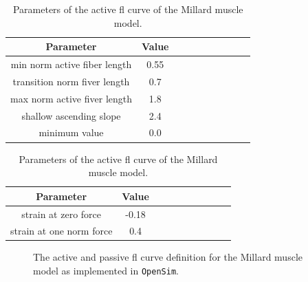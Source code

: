 \documentclass[11pt,a4paper,draft=false]{report}
\begin{document}
\begin{table}
  \centering
  \parbox{.45\linewidth}{
    \centering
    \caption{Parameters of the active \gls{fl} curve of the Millard muscle
      model.}\label{tab:active-fl-curve}
    \begin{tabular}{@{}cccccccccc@{}}
      \toprule
      \textbf{Parameter} & \textbf{Value} \\
      \midrule
      min norm active fiber length & 0.55 \\
      transition norm fiver length & 0.7 \\
      max norm active fiver length & 1.8 \\
      shallow ascending slope &  2.4 \\
      minimum value & 0.0 \\
      \bottomrule
    \end{tabular}
  }
  \quad
  \parbox{.45\linewidth}{
    \vspace{-1.5cm}
    \centering
    \caption{Parameters of the active \gls{fl} curve of the Millard muscle
      model.}\label{tab:passive-fl-curve}
    \begin{tabular}{@{}cccccccccc@{}}
      \toprule
      \textbf{Parameter} & \textbf{Value} \\
      \midrule
      strain at zero force & -0.18 \\
      strain at one norm force & 0.4 \\
      \bottomrule
    \end{tabular}
  }
\end{table}

\begin{figure}[ht]
  \centering
  \caption{The active and passive \gls{fl} curve definition for the Millard
    muscle model as implemented in \texttt{OpenSim}.}\label{fig:millard-curves}
\end{figure}
\end{document}
